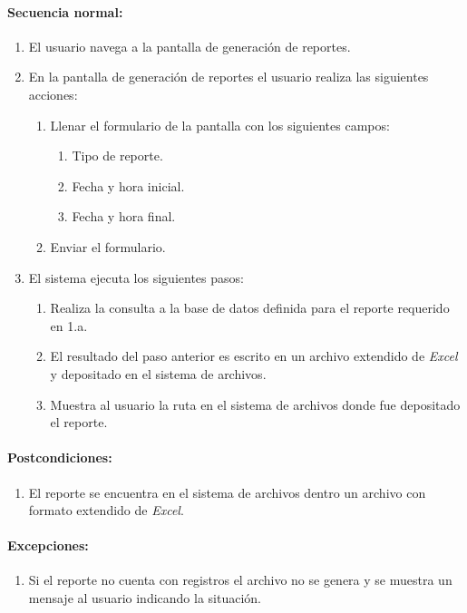 \paragraph{Secuencia normal:}
\begin{enumerate}
  \item El usuario navega a la pantalla de generación de reportes.
  \item En la pantalla de generación de reportes el usuario realiza las siguientes acciones:
    \begin{enumerate}
    \item Llenar el formulario de la pantalla con los siguientes campos:
    \begin{enumerate}
      \item Tipo de reporte.
      \item Fecha y hora inicial.
      \item Fecha y hora final.
    \end{enumerate}
    \item Enviar el formulario.
  \end{enumerate}
  \item El sistema ejecuta los siguientes pasos:
  \begin{enumerate}
    \item Realiza la consulta a la base de datos definida para el reporte requerido en 1.a.
    \item El resultado del paso anterior es escrito en un archivo extendido de \textit{Excel}\textsuperscript{\textcopyright} y depositado en el sistema de archivos.
    \item Muestra al usuario la ruta en el sistema de archivos donde fue depositado el reporte.
  \end{enumerate}
\end{enumerate}
\paragraph{Postcondiciones:}
\begin{enumerate}
  \item El reporte se encuentra en el sistema de archivos dentro un archivo con formato extendido de \textit{Excel}\textsuperscript{\textcopyright}.
\end{enumerate}
\paragraph{Excepciones:}
\begin{enumerate}
  \item Si el reporte no cuenta con registros el archivo no se genera y se muestra un mensaje al usuario indicando la situación.
\end{enumerate}


